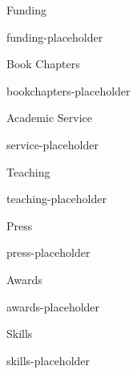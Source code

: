 \begin{cvSection}{Funding}

{{funding-placeholder}}

\end{cvSection}


\begin{cvSection}{Book Chapters}

{{bookchapters-placeholder}}

\end{cvSection}


\begin{cvSection}{Academic Service}

{{service-placeholder}}

\end{cvSection}

\begin{cvSection}{Teaching}

{{teaching-placeholder}}

\end{cvSection}


\begin{cvSection}{Press}

{{press-placeholder}}

\end{cvSection}


\begin{cvSection}{Awards}

{{awards-placeholder}}

\end{cvSection}


\begin{cvSection}{Skills}

{{skills-placeholder}}

\end{cvSection}



